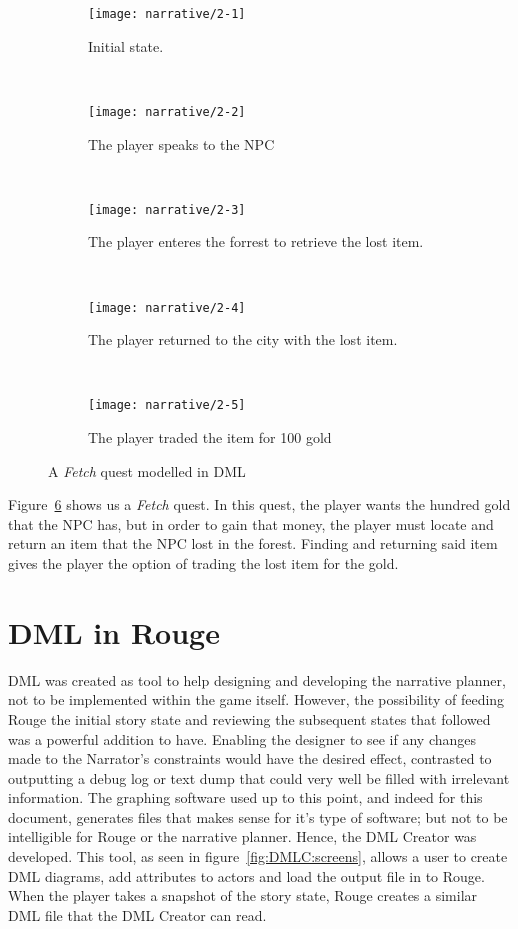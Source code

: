 \begin{figure}[h]
	\centering
	\begin{subfigure}[b]{0.4\textwidth}
		\texttt{[image: narrative/2-1]}
		\caption{Initial state.}\label{fig:narrative2:1}
	\end{subfigure}
		~
	\begin{subfigure}[b]{0.4\textwidth}
		\texttt{[image: narrative/2-2]}
		\caption{The player speaks to the NPC}\label{fig:narrative2:2}
	\end{subfigure}
		~
	\begin{subfigure}[b]{0.4\textwidth}
		\texttt{[image: narrative/2-3]}
		\caption{The player enteres the forrest to retrieve the lost item.}\label{fig:narrative:2:3}
	\end{subfigure}
		~
	\begin{subfigure}[b]{0.4\textwidth}
		\texttt{[image: narrative/2-4]}
		\caption{The player returned to the city with the lost item.}\label{fig:narrative2:4}
	\end{subfigure}
		~
	\begin{subfigure}[b]{0.4\textwidth}
		\texttt{[image: narrative/2-5]}
		\caption{The player traded the item for 100 gold}\label{fig:narrative2:5}
	\end{subfigure}
	\caption{A \textit{Fetch} quest modelled in DML}\label{fig:narrative2}
\end{figure}

Figure~\ref{fig:narrative2} shows us a \textit{Fetch} quest. 
In this quest, the player wants the hundred gold that the NPC has, but in order to gain that money, the player must locate and return an item that the NPC lost in the forest.
Finding and returning said item gives the player the option of trading the lost item for the gold. 

\section{DML in Rouge}
DML was created as tool to help designing and developing the narrative planner, not to be implemented within the game itself. 
However, the possibility of feeding Rouge the initial story state and reviewing the subsequent states that followed was a powerful addition to have.
Enabling the designer to see if any changes made to the Narrator's constraints would have the desired effect, contrasted to outputting a debug log or text dump that could very well be filled with irrelevant information.
The graphing software used up to this point, and indeed for this document, generates files that makes sense for it's type of software; but not to be intelligible for Rouge or the narrative planner.
Hence, the DML Creator was developed.
This tool, as seen in figure~\ref{fig:DMLC:screens}, allows a user to create DML diagrams, add attributes to actors and load the output file in to Rouge.
When the player takes a snapshot of the story state, Rouge creates a similar DML file that the DML Creator can read. 

